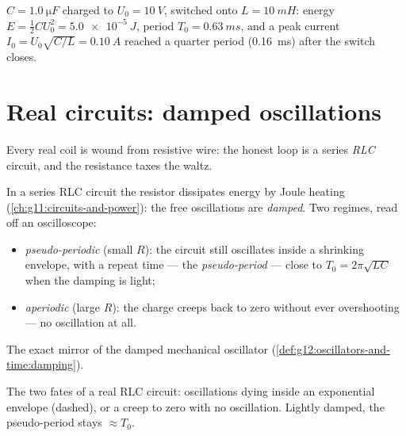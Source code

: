 \begin{example}\label{ex:g12:rlc-oscillations:waltz}
$C = \qty{1.0}{\micro F}$ charged to $U_0 = \qty{10}{V}$, switched onto
$L = \qty{10}{mH}$: energy $E = \tfrac12 C U_0^2 = \qty{5.0e-5}{J}$,
period $T_0 = \qty{0.63}{ms}$, and a peak current
$I_0 = U_0\sqrt{C/L} = \qty{0.10}{A}$ reached a quarter period
(\qty{0.16}{ms}) after the switch closes.
\end{example}

\section{Real circuits: damped oscillations}

Every real coil is wound from resistive wire: the honest loop is a
series \emph{RLC} circuit, and the resistance taxes the waltz.

\begin{definition}\label{def:g12:rlc-oscillations:regimes}
In a series RLC circuit the resistor dissipates energy by Joule
heating (\cref{ch:g11:circuits-and-power}): the free oscillations are
\emph{damped}. Two regimes, read off an oscilloscope:
\begin{itemize}
  \item \emph{pseudo-periodic} (small $R$): the circuit still
        oscillates inside a shrinking envelope, with a repeat time ---
        the \emph{pseudo-period} ---
        close to $T_0 = 2\pi\sqrt{LC}$ when the damping is light;
  \item \emph{aperiodic} (large $R$): the charge creeps back to zero
        without ever overshooting --- no oscillation at all.
\end{itemize}
The exact mirror of the damped mechanical oscillator
(\cref{def:g12:oscillators-and-time:damping}).
\end{definition}

\begin{omfigure}

{\small The two fates of a real RLC circuit: oscillations dying inside
an exponential envelope (dashed), or a creep to zero with no
oscillation. Lightly damped, the pseudo-period stays $\approx T_0$.}
\end{omfigure}

